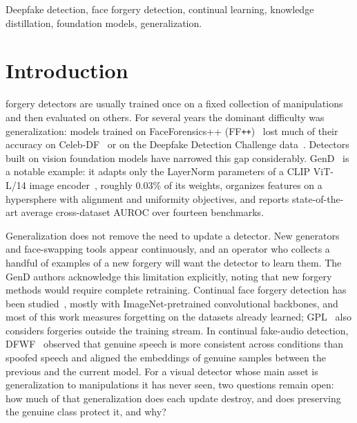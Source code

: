 \documentclass[journal]{IEEEtran}
\newcommand{\ffpp}{FF\texttt{++}}
\begin{document}
\begin{IEEEkeywords}
Deepfake detection, face forgery detection, continual learning, knowledge distillation, foundation models, generalization.
\end{IEEEkeywords}

\section{Introduction}

 forgery detectors are usually trained once on a fixed collection of manipulations and then evaluated on others. For several years the dominant difficulty was generalization: models trained on FaceForensics++ (\ffpp{})~\cite{rossler2019faceforensics} lost much of their accuracy on Celeb-DF~\cite{li2020celebdf} or on the Deepfake Detection Challenge data~\cite{dolhansky2019dfdcpreview}. Detectors built on vision foundation models have narrowed this gap considerably. GenD~\cite{yermakov2026gend} is a notable example: it adapts only the LayerNorm parameters of a CLIP ViT-L/14 image encoder~\cite{radford2021clip}, roughly 0.03\% of its weights, organizes features on a hypersphere with alignment and uniformity objectives, and reports state-of-the-art average cross-dataset AUROC over fourteen benchmarks.

Generalization does not remove the need to update a detector. New generators and face-swapping tools appear continuously, and an operator who collects a handful of examples of a new forgery will want the detector to learn them. The GenD authors acknowledge this limitation explicitly, noting that new forgery methods would require complete retraining. Continual face forgery detection has been studied~\cite{kim2021cored,pan2023dfil,zhang2025gpl}, mostly with ImageNet-pretrained convolutional backbones, and most of this work measures forgetting on the datasets already learned; GPL~\cite{zhang2025gpl} also considers forgeries outside the training stream. In continual fake-audio detection, DFWF~\cite{ma2021dfwf} observed that genuine speech is more consistent across conditions than spoofed speech and aligned the embeddings of genuine samples between the previous and the current model. For a visual detector whose main asset is generalization to manipulations it has never seen, two questions remain open: how much of that generalization does each update destroy, and does preserving the genuine class protect it, and why?
\end{document}
